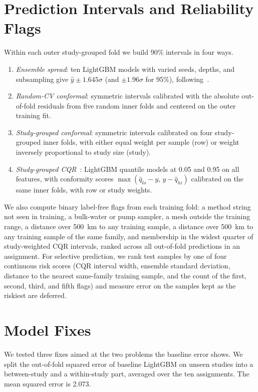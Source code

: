 \documentclass[12pt,a4paper]{report}
\begin{document}
\section{Prediction Intervals and Reliability Flags}
\label{sec:flags}

Within each outer study-grouped fold we build 90\% intervals in four ways.
\begin{enumerate}
\item \emph{Ensemble spread}: ten LightGBM models with varied seeds, depths, and subsampling give $\hat{y}\pm1.645\sigma$ (and $\pm1.96\sigma$ for 95\%), following~\cite{dalvi2026}.
\item \emph{Random-CV conformal}: symmetric intervals calibrated with the absolute out-of-fold residuals from five random inner folds and centered on the outer training fit.
\item \emph{Study-grouped conformal}: symmetric intervals calibrated on four study-grouped inner folds, with either equal weight per sample (row) or weight inversely proportional to study size (study).
\item \emph{Study-grouped CQR}~\cite{romano2019}: LightGBM quantile models at 0.05 and 0.95 on all features, with conformity scores $\max(\hat{q}_{lo}-y,\,y-\hat{q}_{hi})$ calibrated on the same inner folds, with row or study weights.
\end{enumerate}

We also compute binary label-free flags from each training fold: a method string not seen in training, a bulk-water or pump sampler, a mesh outside the training range, a distance over 500~km to any training sample, a distance over 500~km to any training sample of the same family, and membership in the widest quarter of study-weighted CQR intervals, ranked across all out-of-fold predictions in an assignment. For selective prediction, we rank test samples by one of four continuous risk scores (CQR interval width, ensemble standard deviation, distance to the nearest same-family training sample, and the count of the first, second, third, and fifth flags) and measure error on the samples kept as the riskiest are deferred.

\section{Model Fixes}

We tested three fixes aimed at the two problems the baseline error shows. We split the out-of-fold squared error of baseline LightGBM on unseen studies into a between-study and a within-study part, averaged over the ten assignments. The mean squared error is 2.073.
\end{document}
